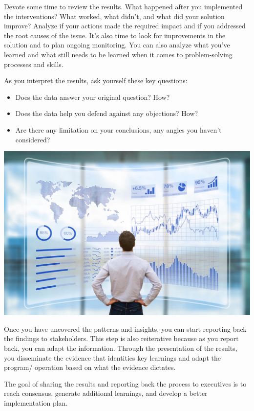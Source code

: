 \documentclass[]{book}
\providecommand{\tightlist}{%
  \setlength{\itemsep}{0pt}\setlength{\parskip}{0pt}}
\begin{document}
Devote some time to review the results. What happened after you implemented the interventions? What worked, what didn't, and what did your solution improve? Analyze if your actions made the required impact and if you addressed the root causes of the issue. It's also time to look for improvements in the solution and to plan ongoing monitoring. You can also analyze what you've learned and what still needs to be learned when it comes to problem-solving processes and skills.

As you interpret the results, ask yourself these key questions:

\begin{itemize}
\tightlist
\item
  Does the data answer your original question? How?
\item
  Does the data help you defend against any objections? How?
\item
  Are there any limitation on your conclusions, any angles you haven't considered?
\end{itemize}

\includegraphics{fig/data-analysis.jpg}

Once you have uncovered the patterns and insights, you can start reporting back the findings to stakeholders. This step is also reiterative because as you report back, you can adapt the information. Through the presentation of the results, you disseminate the evidence that identities key learnings and adapt the program/ operation based on what the evidence dictates.

The goal of sharing the results and reporting back the process to executives is to reach consensus, generate additional learnings, and develop a better implementation plan.
\end{document}

